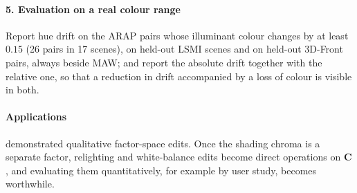 \paragraph{5. Evaluation on a real colour range}
Report hue drift on the ARAP pairs whose
illuminant colour changes by at least $0.15$ (26 pairs in 17 scenes), on held-out LSMI
scenes and on held-out 3D-Front pairs, always beside MAW; and report the absolute drift
together with the relative one, so that a reduction in drift accompanied by a loss of
colour is visible in both.

\paragraph{Applications}
 demonstrated qualitative factor-space edits. Once the shading chroma
is a separate factor, relighting and white-balance edits become direct operations on
$\mathbf{C}$, and evaluating them quantitatively, for example by user study, becomes
worthwhile.
